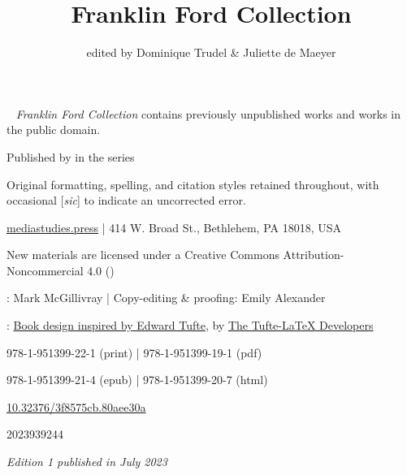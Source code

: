 \documentclass[twoside,symmetric,nobib,justified]{tufte-book}
\title[Franklin Ford Collection]{Franklin Ford Collection}
\date{}
\author[edited by Dominique Trudel \& Juliette de Maeyer]{edited by Dominique Trudel \& Juliette de Maeyer}
\begin{document}
\frontmatter{}\setcounter{page}{1}

\begin{fullwidth}


\maketitle

\end{fullwidth}

\newpage

\begin{fullwidth}

~\vfill
\thispagestyle{empty}
\setlength{\parindent}{0pt}
\setlength{\parskip}{\baselineskip}
\emph{Franklin Ford Collection} contains previously unpublished works and works in the public domain.

\par Published by  in the  series

\par Original formatting, spelling, and citation styles retained throughout, with occasional {[}\emph{sic}{]} to indicate an uncorrected error.

\href{http://mediastudies.press}{mediastudies.press} | 414 W. Broad St., Bethlehem, PA 18018, USA

\par New materials are licensed under a Creative Commons Attribution-Noncommercial 4.0 (\href{https://creativecommons.org/licenses/by-nc/4.0/legalcode}{})

\par {}: Mark McGillivray | Copy-editing \& proofing: Emily Alexander

\par {}: \href{https://www.overleaf.com/latex/templates/book-design-inspired-by-edward-tufte/gcfbtdjfqdjh}{Book design inspired by Edward Tufte}, by \href{https://ctan.org/pkg/tufte-latex}{The Tufte-LaTeX Developers}

\par {} 978-1-951399-22-1 (print) |  978-1-951399-19-1 (pdf)

\par {} 978-1-951399-21-4 (epub) |  978-1-951399-20-7 (html)

\par {} \href{https://doi.org/10.32376/3f8575cb.80aee30a}{10.32376/3f8575cb.80aee30a}

\par {} 2023939244

\par\textit{Edition 1 published in July 2023}

\end{fullwidth}
\end{document}
